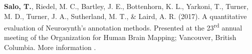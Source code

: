 \documentclass[10pt]{article}
\newcommand{\sectionstyle}{\LARGE \fontfamily{lmr}\selectfont}
\newcommand{\textlink}[3][blue]{\href{#2}{\color{#1}{#3}}}
\begin{document}
\bigskip

\begin{center}\sectionstyle{POSTERS}\end{center}

\begin{hangparas}{.25in}{1}
\textbf{Salo, T.}, Riedel, M. C., Bartley, J. E., Bottenhorn, K. L., Yarkoni, T.,
Turner, M. D., Turner, J. A., Sutherland, M. T., \& Laird, A. R. (2017).
A quantitative evaluation of Neurosynth's annotation methods. Presented at
the 23\textsuperscript{rd} annual meeting of the Organization for Human Brain
Mapping; Vancouver, British Columbia. More information
\textlink{https://nbclab.github.io/posters/salo-neurosynth-poster}{here}.
\end{hangparas}

\bigskip
\end{document}
